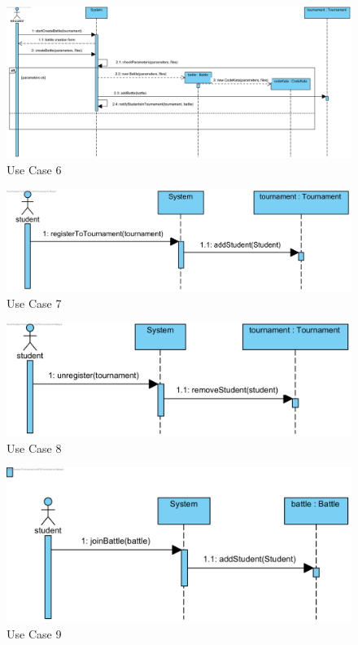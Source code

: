 \documentclass{article}
\begin{document}
\begin{figure}[H]
    \centering
    \includegraphics[width=1\textwidth]{images/UseCaseSequenceDiagrams/UC6}
    \caption{Use Case 6}
    \label{fig:UC6}
\end{figure}

\begin{figure}[H]
    \centering
    \includegraphics[width=1\textwidth]{images/UseCaseSequenceDiagrams/UC7}
    \caption{Use Case 7}
    \label{fig:UC7}
\end{figure}

\begin{figure}[H]
    \centering
    \includegraphics[width=1\textwidth]{images/UseCaseSequenceDiagrams/UC8}
    \caption{Use Case 8}
    \label{fig:UC8}
\end{figure}

\begin{figure}[H]
    \centering
    \includegraphics[width=1\textwidth]{images/UseCaseSequenceDiagrams/UC9}
    \caption{Use Case 9}
    \label{fig:UC9}
\end{figure}
\end{document}

